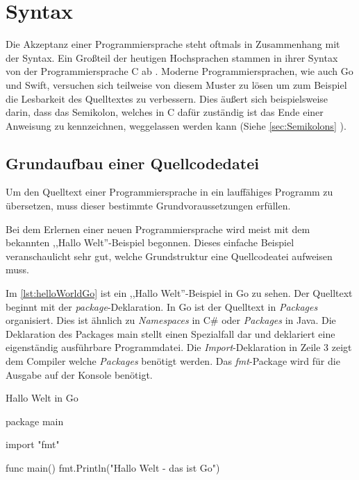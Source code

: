 \chapter{Syntax}
Die Akzeptanz einer Programmiersprache steht oftmals in Zusammenhang mit der Syntax. 
Ein Großteil der heutigen Hochsprachen stammen in ihrer Syntax von der Programmiersprache C ab \cite{Wikipedia.ListProgrammingLanguages}. 
Moderne Programmiersprachen, wie auch Go und Swift, versuchen sich teilweise von diesem Muster zu lösen um zum Beispiel die Lesbarkeit des Quelltextes zu verbessern.
Dies äußert sich beispielsweise darin, dass das Semikolon, welches in C dafür zuständig ist das Ende einer Anweisung zu kennzeichnen, weggelassen werden kann (Siehe \autoref{sec:Semikolons} ).

\section{Grundaufbau einer Quellcodedatei}
Um den Quelltext einer Programmiersprache in ein lauffähiges Programm zu übersetzen, muss dieser bestimmte Grundvoraussetzungen erfüllen.

Bei dem Erlernen einer neuen Programmiersprache wird meist mit dem bekannten ,,Hallo Welt''-Beispiel begonnen.
Dieses einfache Beispiel veranschaulicht sehr gut, welche Grundstruktur eine Quellcodeatei aufweisen muss.

Im \autoref{lst:helloWorldGo} ist ein ,,Hallo Welt''-Beispiel in Go zu sehen.
Der Quelltext beginnt mit der \emph{package}-Deklaration.
In Go ist der Quelltext in \emph{Packages} organisiert. 
Dies ist ähnlich zu \emph{Namespaces} in C\# oder \emph{Packages} in Java.
Die Deklaration des Packages main stellt einen Spezialfall dar und deklariert eine eigenständig ausführbare Programmdatei.
Die \emph{Import}-Deklaration in Zeile 3 zeigt dem Compiler welche \emph{Packages} benötigt werden.
Das \emph{fmt}-Package wird für die Ausgabe auf der Konsole benötigt.

\begin{listing}[H]
\caption{Hallo Welt in Go}
\label{lst:helloWorldGo}
\begin{GoCode}
package main

import "fmt"

func main() {
    fmt.Println("Hallo Welt - das ist Go")
}
\end{GoCode}
\end{listing}

